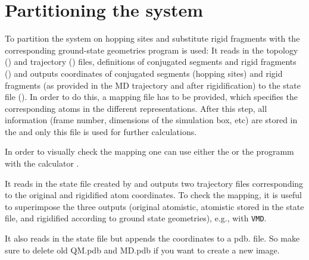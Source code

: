 \section{Partitioning the system}
To partition the system on hopping sites and substitute rigid fragments with the corresponding ground-state geometries \ctpmap program is used:
It reads in the \gromacs topology (\topology) and trajectory (\trajectory) files, definitions of conjugated segments and rigid fragments (\xmlcsg) and outputs coordinates of conjugated segments (hopping sites) and rigid fragments (as provided in the MD trajectory and after rigidification) to the  state file (\sqlstate). In order to do this, a mapping file \xmlcsg has to be provided, which specifies the corresponding atoms in the different representations. After this step, all information (frame number, dimensions of the simulation box, etc) are stored in the  and only this file is used for further calculations.


In order to visually check the mapping one can use either the  \calculator or the programm \ctpdump with the calculator .

\label{sec:ctp_dump}

It reads in the state file created by \ctpmap and outputs two trajectory files corresponding to the original and rigidified atom coordinates. To check the mapping, it is useful to superimpose the three outputs (original atomistic, atomistic stored in the state file, and rigidified according to ground state geometries), e.g., with {\tt VMD}.

\label{sec:tdump}

It also reads in the state file but appends the coordinates to a pdb. file. So make sure to delete old QM.pdb and MD.pdb if you want to create a new image.



